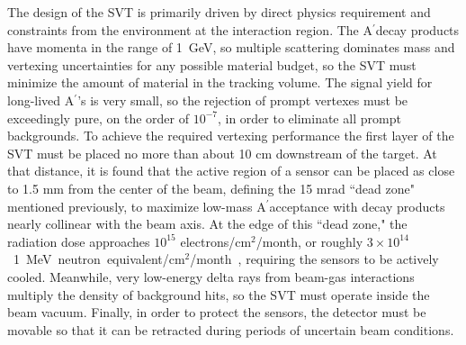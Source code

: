 \documentclass[final,3p,times,twocolumn]{elsarticle}
\newcommand{\Aprime}{A\ensuremath{^\prime}}
\newcommand{\fluenceunit}{1~MeV~neutron~equivalent/cm\ensuremath{^2}}
\begin{document}
The design of the SVT is primarily driven by direct physics requirement and constraints from the 
environment at the interaction region. The \Aprime decay products 
have momenta in the range of 1~GeV, so multiple scattering dominates mass and vertexing 
uncertainties for any possible material budget, so the SVT must minimize the amount of 
material in the tracking volume. The signal yield for long-lived \Aprime's is very small, so 
the rejection of prompt vertexes must be exceedingly pure, on the order of $10^{-7}$, in order to 
eliminate all prompt backgrounds. To achieve the required vertexing performance the first layer of the 
SVT must be placed no more than about 10 cm downstream of the target. At that distance, it is found 
that the active region of a sensor can be placed as close to 1.5 mm from the center of the beam, 
defining the 15 mrad ``dead zone" mentioned previously, to maximize low-mass \Aprime acceptance 
with decay products nearly collinear with the beam axis. At the edge of this ``dead zone," the 
radiation dose approaches $10^{15}$ electrons/cm$^2$/month, or roughly 
$3 \times 10^{14}$~\fluenceunit{}/month~\cite{Rashevskaya:2002nd}, 
requiring the sensors to be actively cooled.
Meanwhile, very low-energy delta rays from 
beam-gas interactions multiply the density of background hits, so the SVT must operate inside the 
beam vacuum.  Finally, in order to protect the sensors, the detector must be movable so that it can be 
retracted during periods of uncertain beam conditions.  
\end{document}
